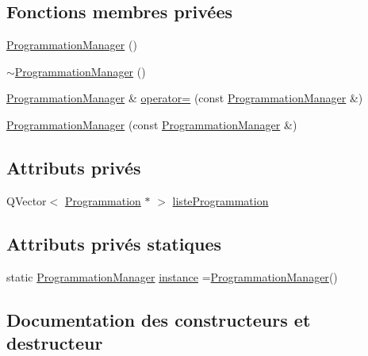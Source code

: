 \subsection*{Fonctions membres privées}
\begin{DoxyCompactItemize}
\item 
\hyperlink{class_programmation_manager_ac493a099c33e7ea0cf8eb4b6036f0a1a}{Programmation\+Manager} ()
\item 
\hyperlink{class_programmation_manager_a51a54dc0fee78a0b831519f3cde27ff6}{$\sim$\+Programmation\+Manager} ()
\item 
\hyperlink{class_programmation_manager}{Programmation\+Manager} \& \hyperlink{class_programmation_manager_a64a3749fe471a9cb58c598d4308ab994}{operator=} (const \hyperlink{class_programmation_manager}{Programmation\+Manager} \&)
\item 
\hyperlink{class_programmation_manager_a05cc9a749fdd300053ea89e947d03571}{Programmation\+Manager} (const \hyperlink{class_programmation_manager}{Programmation\+Manager} \&)
\end{DoxyCompactItemize}
\subsection*{Attributs privés}
\begin{DoxyCompactItemize}
\item 
Q\+Vector$<$ \hyperlink{class_programmation}{Programmation} $\ast$ $>$ \hyperlink{class_programmation_manager_a23540a1467db12d716d19641d70447b8}{liste\+Programmation}
\end{DoxyCompactItemize}
\subsection*{Attributs privés statiques}
\begin{DoxyCompactItemize}
\item 
static \hyperlink{class_programmation_manager}{Programmation\+Manager} \hyperlink{class_programmation_manager_a04ca8715bceaec304a821a6d61b5a94d}{instance} =\hyperlink{class_programmation_manager}{Programmation\+Manager}()
\end{DoxyCompactItemize}


\subsection{Documentation des constructeurs et destructeur}
\hypertarget{class_programmation_manager_ac493a099c33e7ea0cf8eb4b6036f0a1a}{}
